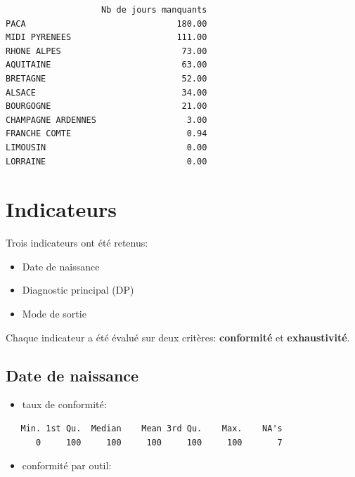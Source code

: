 \documentclass[]{article}
\begin{document}
\begin{verbatim}
                   Nb de jours manquants
PACA                              180.00
MIDI PYRENEES                     111.00
RHONE ALPES                        73.00
AQUITAINE                          63.00
BRETAGNE                           52.00
ALSACE                             34.00
BOURGOGNE                          21.00
CHAMPAGNE ARDENNES                  3.00
FRANCHE COMTE                       0.94
LIMOUSIN                            0.00
LORRAINE                            0.00
\end{verbatim}

\section{Indicateurs}\label{indicateurs}

Trois indicateurs ont été retenus:

\begin{itemize}
\itemsep1pt\parskip0pt
\item
  Date de naissance
\item
  Diagnostic principal (DP)
\item
  Mode de sortie
\end{itemize}

Chaque indicateur a été évalué sur deux critères: \textbf{conformité} et
\textbf{exhaustivité}.

\subsection{Date de naissance}\label{date-de-naissance}

\begin{itemize}
\itemsep1pt\parskip0pt
\item
  taux de conformité:
\end{itemize}

\begin{verbatim}
   Min. 1st Qu.  Median    Mean 3rd Qu.    Max.    NA's 
      0     100     100     100     100     100       7 
\end{verbatim}

\begin{itemize}
\itemsep1pt\parskip0pt
\item
  conformité par outil:
\end{itemize}
\end{document}

